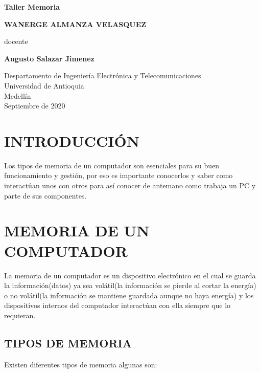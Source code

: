 \documentclass{article}
\begin{document}
\begin{titlepage}
    \begin{center}
        \vspace*{1cm}
            
        \Huge
        \textbf{Taller Memoria}
        \vspace{0.5cm}
        
        \LARGE
        \vspace{1.5cm}
        \textbf{WANERGE ALMANZA VELASQUEZ}
        \vfill

        docente
        
        \vspace{0.5cm}
        \textbf{Augusto Salazar Jimenez}
        \vfill
            
        \Large
        Despartamento de Ingeniería Electrónica y Telecomunicaciones\\
        Universidad de Antioquia\\
        Medellín\\
        Septiembre de 2020
            
    \end{center}
\end{titlepage}

\tableofcontents
\newpage
\section*{\centering INTRODUCCIÓN}\label{intro}
{\raggedleft
Los tipos de memoria de un computador son esenciales para su buen funcionamiento y gestión, por eso es importante conocerlos y saber como interactúan unos con otros para así conocer de antemano como trabaja un PC y parte de sus componentes.
}

\newpage
\section{MEMORIA DE UN COMPUTADOR}
{\raggedleft
La memoria de un computador es un dispositivo electrónico en el cual se guarda la información(datos) ya sea volátil(la información se pierde al cortar la energía) o no volátil(la información se mantiene guardada aunque no haya energía) y los dispositivos internos del computador interactúan con ella siempre que lo requieran.
}
\subsection{TIPOS DE MEMORIA}\label{tipos de memoria}
{\raggedleft
Existen diferentes tipos de memoria algunas son:
}
\end{document}
